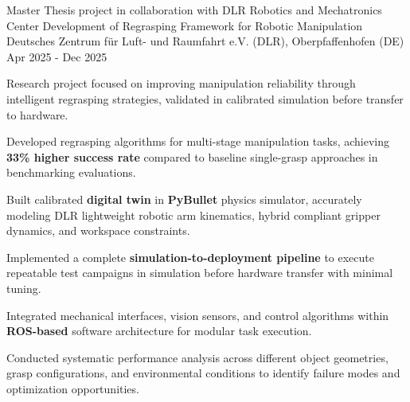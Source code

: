 
\cventry
{Master Thesis project in collaboration with DLR Robotics and Mechatronics Center}
{Development of Regrasping Framework for Robotic Manipulation}
{Deutsches Zentrum für Luft- und Raumfahrt e.V. (DLR), Oberpfaffenhofen (DE)}
{Apr 2025 - Dec 2025}
{
    Research project focused on improving manipulation reliability through intelligent regrasping strategies, validated in calibrated simulation before transfer to hardware.
    \newline
    \vspace{4mm}
    \begin{cvitems}
        \item {Developed regrasping algorithms for multi-stage manipulation tasks, achieving \textbf{33\% higher success rate} compared to baseline single-grasp approaches in benchmarking evaluations.}
        \item {Built calibrated \textbf{digital twin} in \textbf{PyBullet} physics simulator, accurately modeling DLR lightweight robotic arm kinematics, hybrid compliant gripper dynamics, and workspace constraints.}
        \item {Implemented a complete \textbf{simulation-to-deployment pipeline} to execute repeatable test campaigns in simulation before hardware transfer with minimal tuning.}
        \item {Integrated mechanical interfaces, vision sensors, and control algorithms within \textbf{ROS-based} software architecture for modular task execution.}
        \item {Conducted systematic performance analysis across different object geometries, grasp configurations, and environmental conditions to identify failure modes and optimization opportunities.}
    \end{cvitems}
}

